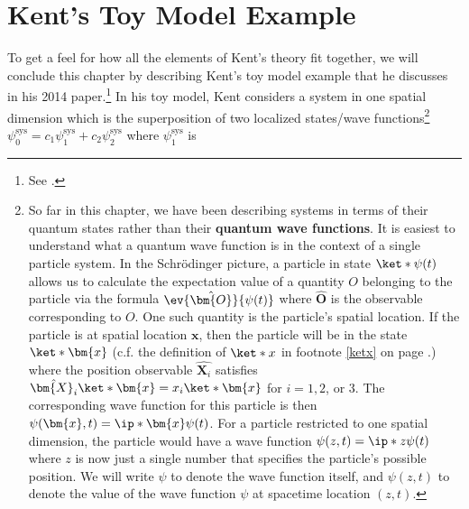\documentclass[12pt]{report}
\begin{document}
 
 
\section{Kent's Toy Model Example}\label{toysection}
To get a feel for how all the elements of Kent's theory fit together, we will conclude this chapter by describing Kent's toy model example that he discusses in his 2014 paper.\footnote{See \cite[p. 3--4]{Kent2014}.} In his toy model, Kent considers a system in one spatial dimension which is the superposition of two localized states/wave functions\footnote{So far in this chapter, we have been describing systems in terms of their quantum states rather than their \textbf{quantum wave functions}.\label{wavefunctionfootnote} It is easiest to understand what a quantum wave function is in the context of a single particle system. In the Schr\"{o}dinger picture, a particle in state $\ket*{\psi(t)}$ allows us to calculate the expectation value of a quantity $O$ belonging to the particle via the formula $\ev{\hat{\bm{O}}}{\psi(t)}$ where $\hat{\bm{O}}$ is the observable corresponding to $O$. One such quantity is the particle's spatial location. If the particle is at spatial location $\bm{x}$, then the particle will be in the state $\ket*{\bm{x}}$ (c.f. the definition of $\ket*{x}$ in footnote \ref{ketx} on page \pageref{ketx}.) where the position observable $\hat{\bm{X}_i}$ satisfies $\hat{\bm{X}_i}\ket*{\bm{x}}=x_i\ket*{\bm{x}}$ for $i=1,2$, or $3$. The corresponding wave function for this particle is then   $\psi(\bm{x}, t)=\ip*{\bm{x}}{\psi(t)}$. For a particle restricted to one spatial dimension, the particle would have a wave function $\psi(z, t)=\ip*{z}{\psi(t)}$ where $z$ is now just a single number that specifies the particle's possible position. We will write $\psi$ to denote the wave function itself, and $\psi(z,t)$ to denote the value of the wave function $\psi$ at spacetime location $(z,t)$.}  $\psi_0^\text{sys}=c_1 \psi_1^\text{sys}+c_2\psi_2^\text{sys}$ where %
%
 $\psi_1^\text{sys}$ is %
\end{document}

